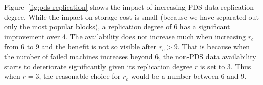 

%
Figure~\ref{fig:pds-replication} shows
the impact of increasing PDS data replication degree. 
While the impact on storage cost is small (because we have separated out only
the most popular blocks),
a replication degree of 6  has a significant improvement over 4. The
availability does not increase much  when increasing
$r_c$ from 6 to 9 and the benefit is not so visible after $r_c>9$. 
That is because when the number of failed machines increases beyond 6, 
the non-PDS data availability starts to deteriorate significantly given its replication degree
$r$ is set to 3. Thus when $r=3$, the reasonable choice for $r_c$ would be a number between 6 and 9.
 


